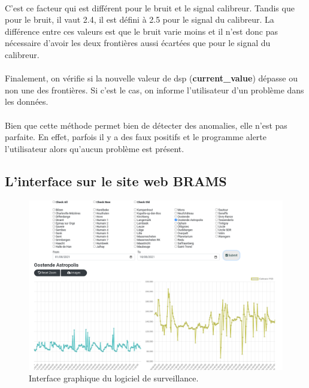 \documentclass[11pt]{article}
\begin{document}
\\
C'est ce facteur qui est différent pour le bruit et le signal calibreur.
Tandis que pour le bruit, il vaut 2.4, il est défini à  2.5 pour le signal du calibreur.
La différence entre ces valeurs est que le bruit varie moins et il n'est donc pas nécessaire d'avoir les deux frontières aussi écartées que pour le signal du calibreur.\\
\\
Finalement, on vérifie si la nouvelle valeur de dsp (\textbf{current\_value}) dépasse ou non une des frontières.
Si c'est le cas, on informe l'utilisateur d'un problème dans les données.\\
\\
Bien que cette méthode permet bien de détecter des anomalies, elle n'est pas parfaite.
En effet, parfois il y a des faux positifs et le programme alerte l'utilisateur alors qu'aucun problème est présent.

\subsection{L'interface sur le site web BRAMS}

\begin{figure}[t]
    \begin{center}
        \includegraphics[scale=0.22]{monitoring_ui.png}
        \caption{Interface graphique du logiciel de surveillance.}
        \label{fig:monitoring-ui}
    \end{center}
\end{figure}
\end{document}
